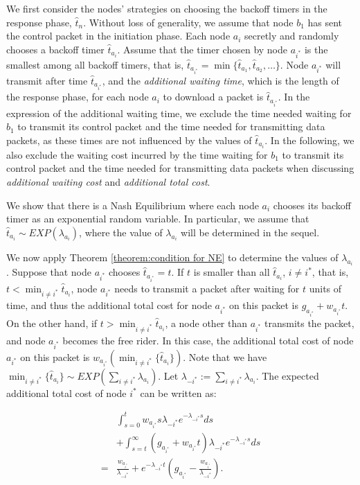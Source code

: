 \documentclass[11pt, conference]{IEEEtran}
\begin{document}
We first consider the nodes' strategies on choosing the backoff timers in the response phase, $\hat{t}_n$. Without loss of generality, we assume that node $b_1$ has sent the control packet in the initiation phase. Each node $a_i$ secretly and randomly chooses a backoff timer $\hat{t}_{a_i}$. Assume that the timer chosen by node $a_{i^*}$ is the smallest among all backoff timers, that is, $\hat{t}_{a_{i^*}}=\min\{\hat{t}_{a_1}, \hat{t}_{a_2},\dots\}$. Node $a_{i^*}$ will transmit after time $\hat{t}_{a_{i^*}}$, and the \emph{additional waiting time}, which is the length of the response phase, for each node $a_i$ to download a packet is $\hat{t}_{a_{i^*}}$. In the expression of the additional waiting time, we exclude the time needed waiting for $b_1$ to transmit its control packet and the time needed for transmitting data packets, as these times are not influenced by the values of $\hat{t}_{a_i}$. In the following, we also exclude the waiting cost incurred by the time waiting for $b_1$ to transmit its control packet and the time needed for transmitting data packets when discussing \emph{additional waiting cost} and \emph{additional total cost}.

We show that there is a Nash Equilibrium where each node $a_i$ chooses its backoff timer as an exponential random variable. In particular, we assume that $\hat{t}_{a_i}\sim EXP(\lambda_{a_i})$, where the value of $\lambda_{a_i}$ will be determined in the sequel.

We now apply Theorem \ref{theorem:condition for NE} to determine the values of $\lambda_{a_i}$. Suppose that node $a_{i^*}$ chooses $\hat{t}_{a_{i^*}}=t$. If $t$ is smaller than all $\hat{t}_{a_i}$, $i\neq i^*$, that is, $t<\min_{i\neq i^*}\hat{t}_{a_i}$, node $a_{i^*}$ needs to transmit a packet after waiting for $t$ units of time, and thus the additional total cost for node $a_{i^*}$ on this packet is $g_{a_{i^*}}+w_{a_{i^*}}t$. On the other hand, if $t>\min_{i\neq i^*}\hat{t}_{a_i}$, a node other than $a_{i^*}$ transmits the packet, and node $a_{i^*}$ becomes the free rider. In this case, the additional total cost of node $a_{i^*}$ on this packet is $w_{a_{i^*}}(\min_{i\neq i^*}\{\hat{t}_{a_i}\})$. Note that we have $\min_{i\neq i^*}\{\hat{t}_{a_i}\}\sim EXP(\sum_{i\neq i^*}\lambda_{a_i})$. Let $\lambda_{-i^*}:=\sum_{i\neq i^*}\lambda_{a_i}$. The expected additional total cost of node $i^*$ can be written as:

\begin{align}
&\int_{s=0}^t w_{a_{i^*}}s\lambda_{-i^*}e^{-\lambda_{-i^*}s}ds\nonumber\\
&+\int_{s=t}^\infty(g_{a_{i^*}}+w_{a_{i^*}}t)\lambda_{-i^*}e^{-\lambda_{-i^*}s}ds\nonumber\\
=&\frac{w_{a_{i^*}}}{\lambda_{-i^*}}+e^{-\lambda_{-i^*}t}(g_{a_{i^*}}-\frac{w_{a_{i^*}}}{\lambda_{-i^*}}). \label{equation:bilateral:costA}
\end{align}
\end{document}
